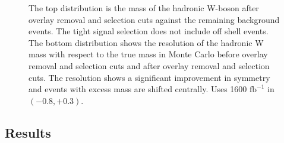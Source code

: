 \begin{figure}
   
        \centering
     \caption{The top distribution is the mass of the hadronic W-boson after overlay removal and selection cuts against the remaining background events. The tight signal selection does not include off shell events. The bottom distribution shows the resolution of the hadronic W mass with respect to the true mass in Monte Carlo before overlay removal and selection cuts and after overlay removal and selection cuts. The resolution shows a significant improvement in symmetry and events with excess mass are shifted centrally.  Uses 1600 $\text{fb}^{-1}$ in $(-0.8,+0.3)$. 
}
\label{fig:money}
\end{figure}

\subsection{Results}
\label{subsec:wmass}

